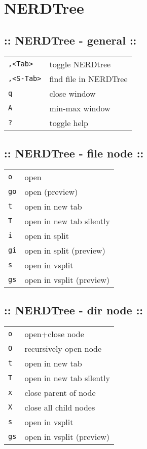 \section{\hrulefill NERDTree\hrulefill}
\subsection{:: NERDTree - general ::}
\begin{tabular}{@{}ll@{}}
\verb!,<Tab>!   & toggle NERDtree \\
\verb!,<S-Tab>! & find file in NERDTree \\
\verb!q!        & close window \\
\verb!A!        & min-max window \\
\verb!?!        & toggle help \\
\end{tabular}

\subsection{:: NERDTree - file node ::}
\begin{tabular}{@{}ll@{}}
\verb!o!        & open \\
\verb!go!       & open (preview) \\
\verb!t!        & open in new tab \\
\verb!T!        & open in new tab silently \\
\verb!i!        & open in split \\
\verb!gi!       & open in split (preview) \\
\verb!s!        & open in vsplit \\
\verb!gs!       & open in vsplit (preview) \\
\end{tabular}

\subsection{:: NERDTree - dir node ::}
\begin{tabular}{@{}ll@{}}
\verb!o!        & open+close node \\
\verb!O!        & recursively open node \\
\verb!t!        & open in new tab \\
\verb!T!        & open in new tab silently \\
\verb!x!        & close parent of node \\
\verb!X!        & close all child nodes \\
\verb!s!        & open in vsplit \\
\verb!gs!       & open in vsplit (preview) \\
\end{tabular}

